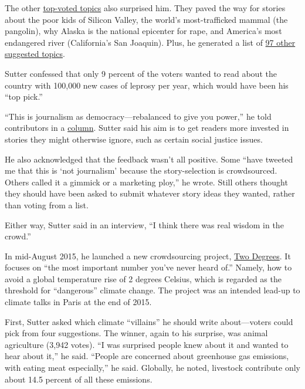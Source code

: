 \begin{itemize}
\begin{itemize}
\begin{enumerate}
The other \href{http://www.cnn.com/2013/06/18/opinion/sutter-ctl-vote-results/}{top-voted topics} also surprised him.\autocite{column} They paved the way for stories about the poor kids of Silicon Valley, the world’s most-trafficked mammal (the pangolin), why Alaska is the national epicenter for rape, and America’s most endangered river (California’s San Joaquin). Plus, he generated a list of \href{http://www.cnn.com/2013/06/14/opinion/sutter-ctl-97-ideas/index.html?hpt=hp_c4}{97 other suggested topics}.\autocite{column} 

Sutter confessed that only 9 percent of the voters wanted to read about the country with 100,000 new cases of leprosy per year, which would have been his ``top pick.''

``This is journalism as democracy---rebalanced to give you power,'' he told contributors in a \href{http://www.cnn.com/2013/06/18/opinion/sutter-ctl-vote-results/index.html}{column}.\autocite{column} Sutter said his aim is to get readers more invested in stories they might otherwise ignore, such as certain social justice issues.  

He also acknowledged that the feedback wasn’t all positive. Some 
``have tweeted me that this is ‘not journalism’ because the story-selection is crowdsourced. Others called it a gimmick or a marketing ploy,'' he wrote.\autocite{column} Still others thought they should have been asked to submit whatever story ideas they wanted, rather than voting from a list. 

Either way, Sutter said in an interview, ``I think there was real wisdom in the crowd.''\autocite{CNN}

In mid-August 2015, he launched a new crowdsourcing project, \href{http://www.cnn.com/specials/opinions/two-degrees}{Two Degrees}. It focuses on ``the most important number you’ve never heard of.'' Namely, how to avoid a global temperature rise of 2 degrees Celsius, which is regarded as the threshold for ``dangerous'' climate change.\autocite{CNN} The project was an intended lead-up to climate talks in Paris at the end of 2015. 

First, Sutter asked which climate ``villains'' he should write about---voters could pick from four suggestions. The winner, again to his surprise, was animal agriculture (3,942 votes). ``I was surprised people knew about it and wanted to hear about it,'' he said. ``People are concerned about greenhouse gas emissions, with eating meat especially,'' he said. Globally, he noted, livestock contribute only about 14.5 percent of all these emissions.


\end{enumerate}
\end{itemize}
\end{itemize}
